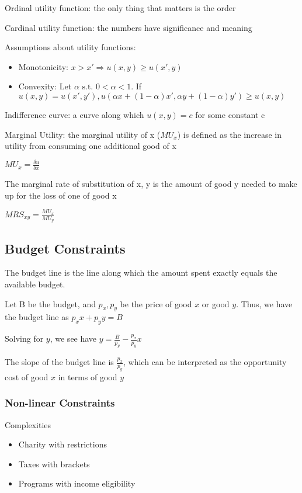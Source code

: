 \documentclass[12pt]{article}
\begin{document}
Ordinal utility function: the only thing that matters is the order

Cardinal utility function: the numbers have significance and meaning

Assumptions about utility functions:
\begin{itemize}
    \item Monotonicity: $x > x' \Rightarrow u(x,y) \ge u(x', y)$
    \item Convexity: Let $\alpha \text{ s.t. } 0 < \alpha < 1$. If $u(x,y) = u(x',y'), u(\alpha x + (1 - \alpha)x', \alpha y + (1 - \alpha)y') \ge u(x,y)$
\end{itemize}

Indifference curve: a curve along which $u(x,y) = c$ for some constant c

Marginal Utility: the marginal utility of x ($MU_{x}$) is defined as the increase in utility from consuming one additional good of x

$MU_{x} = \frac{\delta u}{\delta x}$

The marginal rate of substitution of x, y is the amount of good y needed to make up for the loss of one of good x

$MRS_{xy} = \frac{MU_{x}}{MU_{y}}$

\subsection{Budget Constraints}

The budget line is the line along which the amount spent exactly equals the available budget.

Let B be the budget, and $p_{x}, p_{y}$ be the price of good $x$ or good $y$. Thus, we have the budget line as $p_{x}x + p_{y}y = B$

Solving for $y$, we see have $y = \frac{B}{p_{y}} - \frac{p_{x}}{p_{y}}x$

The slope of the budget line is $\frac{p_{x}}{p_{y}}$, which can be interpreted as the opportunity cost of good $x$ in terms of good $y$

\subsubsection{Non-linear Constraints}

Complexities
\begin{itemize}
    \item Charity with restrictions
    \item Taxes with brackets
    \item Programs with income eligibility
\end{itemize}
\end{document}
